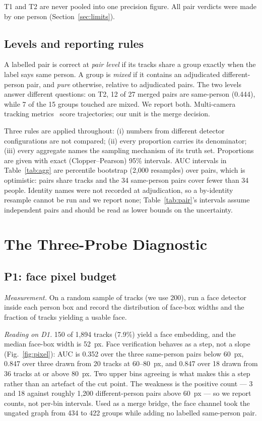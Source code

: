 \documentclass[journal]{IEEEtran}
\begin{document}
T1 and T2 are never pooled into one precision figure. All pair verdicts were made by one person (Section~\ref{sec:limits}).

\subsection{Levels and reporting rules}
A labelled pair is correct at \emph{pair level} if its tracks share a group exactly when the label says same person. A group is \emph{mixed} if it contains an adjudicated different-person pair, and \emph{pure} otherwise, relative to adjudicated pairs. The two levels answer different questions: on T2, 12 of 27 merged pairs are same-person (0.444), while 7 of the 15 groups touched are mixed. We report both. Multi-camera tracking metrics~\cite{luiten2021,ristani2016} score trajectories; our unit is the merge decision.

Three rules are applied throughout: (i) numbers from different detector configurations are not compared; (ii) every proportion carries its denominator; (iii) every aggregate names the sampling mechanism of its truth set. Proportions are given with exact (Clopper--Pearson) 95\% intervals. AUC intervals in Table~\ref{tab:agg} are percentile bootstrap (2,000 resamples) over pairs, which is optimistic: pairs share tracks and the 34 same-person pairs cover fewer than 34 people. Identity names were not recorded at adjudication, so a by-identity resample cannot be run and we report none; Table~\ref{tab:pair}'s intervals assume independent pairs and should be read as lower bounds on the uncertainty.

\section{The Three-Probe Diagnostic}\label{sec:probes}
\subsection{P1: face pixel budget}
\emph{Measurement.} On a random sample of tracks (we use 200), run a face detector inside each person box and record the distribution of face-box widths and the fraction of tracks yielding a usable face.

\emph{Reading on D1.} 150 of 1,894 tracks (7.9\%) yield a face embedding, and the median face-box width is 52~px. Face verification behaves as a step, not a slope (Fig.~\ref{fig:pixel}): AUC is 0.352 over the three same-person pairs below 60~px, 0.847 over three drawn from 20 tracks at 60--80~px, and 0.847 over 18 drawn from 36 tracks at or above 80~px. Two upper bins agreeing is what makes this a step rather than an artefact of the cut point. The weakness is the positive count --- 3 and 18 against roughly 1,200 different-person pairs above 60~px --- so we report counts, not per-bin intervals. Used as a merge bridge, the face channel took the ungated graph from 434 to 422 groups while adding no labelled same-person pair.
\end{document}
